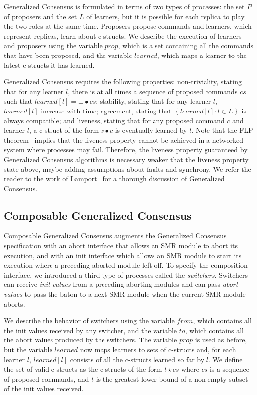 Generalized Consensus is formulated in terms of two types of processes: the set $P$ of proposers and the set $L$ of learners, but it is possible for each replica to play the two roles at the same time. Proposers propose commands and learners, which represent replicas, learn about c-structs.
We describe the execution of learners and proposers using the variable $prop$, which is a set containing all the commands that have been proposed, and the variable $learned$, which maps a learner to the latest c-structs it has learned.

Generalized Consensus requires the following properties: non-triviality, stating that for any learner $l$, there is at all times a sequence of proposed commands $cs$ such that $learned\left[l\right] = \bot \bullet cs$; stability, stating that for any learner $l$, $learned\left[ l \right]$ increase with time; agreement, stating that $\left\{ learned\left[ l \right] :  l \in L\right\}$ is always compatible; and liveness, stating that for any proposed command $c$ and learner $l$, a c-struct of the form $s\bullet c$ is eventually learned by $l$.
Note that the FLP theorem~\cite{FischerLynchPaterson83ImpossibilityDistributedConsensusOneFaultyProcess} implies that the liveness property cannot be achieved in a networked system where processes may fail. Therefore, the liveness property guaranteed by Generalized Consensus algorithms is necessary weaker that the liveness property state above, maybe adding assumptions about faults and synchrony.
We refer the reader to the work of Lamport~\cite{Lamport05GeneralizeConsensus} for a thorough discussion of Generalized Consensus.

\subsection{Composable Generalized Consensus}

Composable Generalized Consensus augments the Generalized Consensus specification with an abort interface that allows an SMR module to abort its execution, and with an init interface which allows an SMR module to start its execution where a preceding aborted module left off.
To specify the composition interface, we introduced a third type of processes called the \emph{switchers}. Switchers can receive \emph{init values} from a preceding aborting modules and can pass \emph{abort values} to pass the baton to a next SMR module when the current SMR module aborts.

We describe the behavior of switchers using the variable $from$, which contains all the init values received by any switcher, and the variable $to$, which contains all the abort values produced by the switchers.
The variable $prop$ is used as before, but the variable $learned$ now maps learners to sets of c-structs and, for each learner $l$, $learned\left[ l \right]$ consists of all the c-structs learned so far by $l$.
We define the set of valid c-structs as the c-structs of the form $t\star cs$ where $cs$ is a sequence of proposed commands, and $t$ is the greatest lower bound of a non-empty subset of the init values received.

